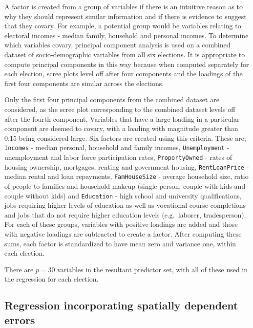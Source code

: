 \documentclass[11pt,a4paper,]{article}
\begin{document}
A factor is created from a group of variables if there is an intuitive reason as to why they should represent similar information and if there is evidence to suggest that they covary. For example, a potential group would be variables relating to electoral incomes - median family, household and personal incomes. To determine which variables covary, principal component analysis is used on a combined dataset of socio-demographic variables from all six elections. It is appropriate to compute principal components in this way because when computed separately for each election, scree plots level off after four components and the loadings of the first four components are similar across the elections.

Only the first four principal components from the combined dataset are considered, as the scree plot corresponding to the combined dataset levels off after the fourth component. Variables that have a large loading in a particular component are deemed to covary, with a loading with magnitude greater than 0.15 being considered large. Six factors are created using this criteria. These are; \texttt{Incomes} - median personal, household and family incomes, \texttt{Unemployment} - unemployment and labor force participation rates, \texttt{ProportyOwned} - rates of housing ownership, mortgages, renting and government housing, \texttt{RentLoanPrice} - median rental and loan repayments, \texttt{FamHouseSize} - average household size, ratio of people to families and household makeup (single person, couple with kids and couple without kids) and \texttt{Education} - high school and university qualifications, jobs requiring higher levels of education as well as vocational course completions and jobs that do not require higher education levels (e.g.~laborer, tradesperson). For each of these groups, variables with positive loadings are added and those with negative loadings are subtracted to create a factor. After computing these sums, each factor is standardized to have mean zero and variance one, within each election.

There are \(p=30\) variables in the resultant predictor set, with all of these used in the regression for each election.

\hypertarget{regression-incorporating-spatially-dependent-errors}{%
\subsection{Regression incorporating spatially dependent errors}\label{regression-incorporating-spatially-dependent-errors}}
\end{document}
